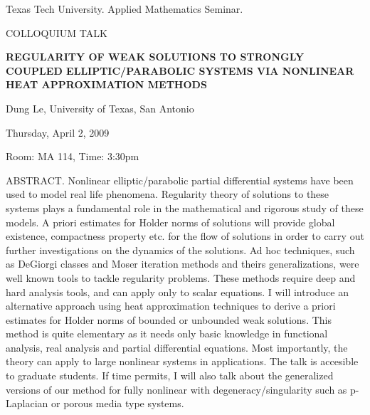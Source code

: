\documentclass[oneside]{amsart}
\begin{document}
\begin{center}
Texas Tech University.  Applied Mathematics Seminar.

COLLOQUIUM TALK
\end{center}

\begin{center}

{\LARGE \uppercase{\textbf{
Regularity of weak solutions to strongly coupled elliptic/parabolic systems via nonlinear heat approximation methods
}}}

Dung Le, University of Texas, San Antonio

Thursday, April 2, 2009

Room: MA 114, Time: 3:30pm

\end{center}

ABSTRACT. Nonlinear elliptic/parabolic partial differential systems have been used to model real life phenomena. Regularity theory of solutions to these systems plays a fundamental role in the mathematical and rigorous study of these models. A priori estimates for Holder norms of solutions will provide global existence, compactness property etc. for the flow of solutions in order to carry out further investigations on the dynamics of the solutions. Ad hoc techniques, such as DeGiorgi classes and Moser iteration methods and theirs generalizations, were well known tools to tackle regularity problems. These methods require deep and hard analysis tools, and can apply only to scalar equations. I will introduce an alternative approach using heat approximation techniques to derive a priori estimates for Holder norms of bounded or unbounded weak solutions. This method is quite elementary as it needs only basic knowledge in functional analysis, real analysis and partial differential equations. Most importantly, the theory can apply to large nonlinear systems in applications. The talk is accesible to graduate students. If time permits, I will also talk about the generalized versions of our method for fully nonlinear with degeneracy/singularity such as p-Laplacian or porous media type systems.
\end{document}
